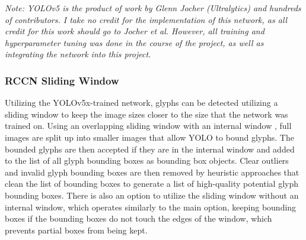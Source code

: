 \textit{Note: YOLOv5 is the product of work by Glenn Jocher (Ultralytics) and hundreds of contributors. I take no credit for the implementation of this network, as all credit for this work should go to Jocher et al. However, all training and hyperparameter tuning was done in the course of the project, as well as integrating the network into this project.}

\subsubsection{RCCN Sliding Window}

Utilizing the YOLOv5x-trained network, glyphs can be detected utilizing a sliding window to keep the image sizes closer to the size that the network was trained on. Using an overlapping sliding window with an internal window , full images are split up into smaller images that allow YOLO to bound glyphs. The bounded glyphs are then accepted if they are in the internal window and added to the list of all glyph bounding boxes as bounding box objects. Clear outliers and invalid glyph bounding boxes are then removed by heuristic approaches that clean the list of bounding boxes to generate a list of high-quality potential glyph bounding boxes. There is also an option to utilize the sliding window without an internal window, which operates similarly to the main option, keeping bounding boxes if the bounding boxes do not touch the edges of the window, which prevents partial boxes from being kept.

